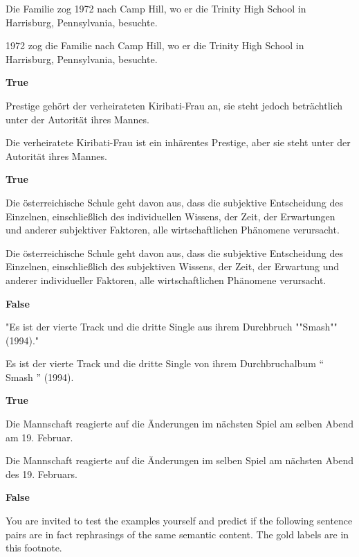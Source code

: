 \begin{examples}
  \label{ex:paws-x}
  \item Die Familie zog 1972 nach Camp Hill, wo er die Trinity High School in Harrisburg, Pennsylvania, besuchte.

  1972 zog die Familie nach Camp Hill, wo er die Trinity High School in Harrisburg, Pennsylvania, besuchte.

  \textbf{True}
  \item Prestige gehört der verheirateten Kiribati-Frau an, sie steht jedoch beträchtlich unter der Autorität ihres Mannes.

  Die verheiratete Kiribati-Frau ist ein inhärentes Prestige, aber sie steht unter der Autorität ihres Mannes.

  \textbf{True}
  \item Die österreichische Schule geht davon aus, dass die subjektive Entscheidung des Einzelnen, einschließlich des individuellen Wissens, der Zeit, der Erwartungen und anderer subjektiver Faktoren, alle wirtschaftlichen Phänomene verursacht.

  Die österreichische Schule geht davon aus, dass die subjektive Entscheidung des Einzelnen, einschließlich des subjektiven Wissens, der Zeit, der Erwartung und anderer individueller Faktoren, alle wirtschaftlichen Phänomene verursacht.

  \textbf{False}
  \item "Es ist der vierte Track und die dritte Single aus ihrem Durchbruch ""Smash"" (1994)."

  Es ist der vierte Track und die dritte Single von ihrem Durchbruchalbum `` Smash '' (1994).

  \textbf{True}
  \item Die Mannschaft reagierte auf die Änderungen im nächsten Spiel am selben Abend am 19. Februar.

  Die Mannschaft reagierte auf die Änderungen im selben Spiel am nächsten Abend des 19. Februars.

  \textbf{False}
\end{examples}



You are invited to test the examples yourself and predict if the following sentence pairs are in fact rephrasings
of the same semantic content. The gold labels are in this footnote.


